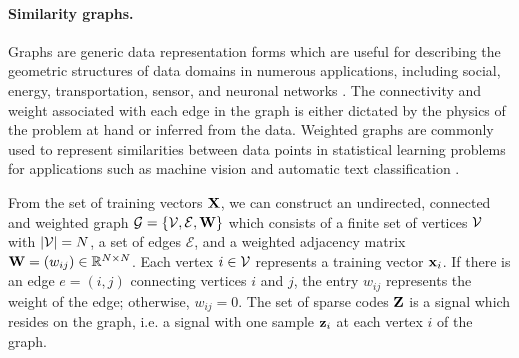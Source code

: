 \paragraph{Similarity graphs.}
Graphs are generic data representation forms which are useful for describing the geometric structures of data domains in numerous applications, including social, energy, transportation, sensor, and neuronal networks \cite{pierre2013graphs}. The connectivity and weight associated with each edge in the graph is either dictated by the physics of the problem at hand or inferred from the data.
Weighted graphs are commonly used to represent similarities between data points in statistical learning problems for applications such as machine vision \cite{lowe1999graphSimilarity} and automatic text classification \cite{apte1994graphSimilarity}.



From the set of training vectors $\mathbf{X}$, we can construct an undirected, connected and weighted graph $\mathcal{G} = \{ \mathcal{V}, \mathcal{E}, \mathbf{W} \}$ which consists of a finite set of vertices $\mathcal{V}$ with $|\mathcal{V}| = N$, a set of edges $\mathcal{E}$, and a weighted adjacency matrix $\mathbf{W} = (w_{ij}) \in \mathbb{R}^{N \times N}$. Each vertex $i \in \mathcal{V}$ represents a training vector $\mathbf{x}_i$. If there is an edge $e = (i, j)$ connecting vertices $i$ and $j$, the entry $w_{ij}$ represents the weight of the edge; otherwise, $w_{ij} = 0$. The set of sparse codes $\mathbf{Z}$ is a signal which resides on the graph, i.e. a signal with one sample $\mathbf{z}_i$ at each vertex $i$ of the graph.

